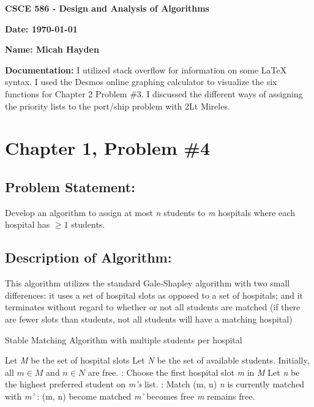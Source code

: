 \documentclass{article}
\begin{document}
\noindent \textbf{CSCE 586 - Design and Analysis of Algorithms}

\noindent \textbf{Date:  \today }

\noindent \textbf{Name:  Micah Hayden}

\noindent \textbf{Documentation:} I utilized stack overflow for information on some LaTeX syntax.  I used the Desmos online graphing calculator to visualize the six functions for Chapter 2 Problem \#3.
I discussed the different ways of assigning the priority lists to the port/ship problem with 2Lt Mireles.

\hrulefill

\section*{Chapter 1, Problem \#4}
\subsection*{Problem Statement:}  Develop an algorithm to assign at most \textit{n} students to \textit{m} hospitals where each hospital has $\geq 1$ students.  

\subsection*{Description of Algorithm:}
	This algorithm utilizes the standard Gale-Shapley algorithm with two small differences:  it uses a set of hospital slots as opposed to a set of hospitals; and it terminates without regard to whether or not all students are matched (if there are fewer slots than students, not all students will have a matching hospital)


\begin{algorithm} %
\caption{Stable Matching Algorithm with multiple students per hospital} %
\begin{algorithmic} %
    \State Let \textit{M} be the set of hospital slots
    \State Let \textit{N} be the set of available students. 
	\State Initially, all $m \in M$ and $n \in N$ are free.
    :
    	\State Choose the first hospital slot \textit{m} in \textit{M}
    	\State Let \textit{n} be the highest preferred student on \textit{m's} list.
    	:
    		\State Match (m, n)
    	\Else
    		\Comment \textit{n} is currently matched with \textit{m'}
    		:
    			\State (m, n) become matched
    			\State \textit{m'} becomes free
    		\Else
    			 \State \textit{m} remains free.
    		\EndIf
    	\EndIf
	\EndWhile    
\end{algorithmic}
\end{algorithm}
\end{document}
